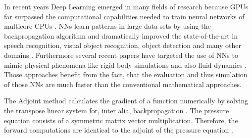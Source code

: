 \newpage
\par In recent years Deep Learning emerged in many fields of research because GPUs far surpassed the computational capabilities needed to train neural networks of multicore CPUs \parencite{raina2009large}. NNs learn patterns in large data sets by using the backpropagation algorithm and dramatically improved the state-of-the-art in speech recognition, visual object recognition, object detection and many other domains \parencite{lecun2015deep}. Furthermore several recent papers have targeted the use of NNs to mimic physical phenomena like rigid-body simulations \parencite{chang2016compositional} and also fluid dynamics \parencite{tompson2017accelerating}\parencite{chu2017data}\parencite{schenck2018spnets}. Those approaches benefit from the fact, that the evaluation and thus simulation of those NNs are much faster than the conventional mathematical approaches.
\par The Adjoint method calculates the gradient of a function numerically by solving the transpose linear system for, inter alia, backpropagation \parencite{lions1971optimal}. The pressure equation consists of a symmetric matrix vector multiplication. Therefore, the forward computations are identical to the adjoint of the pressure equation \parencite{mcnamara2004fluid}.